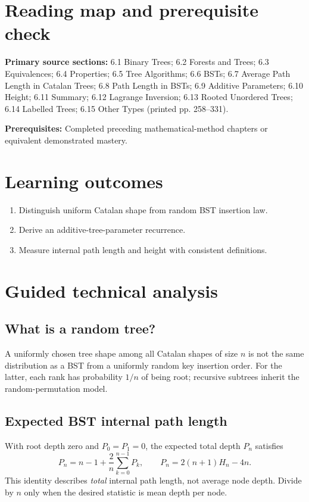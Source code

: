\documentclass[11pt]{article}
\begin{document}
\makedoctocpage
\section{Reading map and prerequisite check}
\noindent\textbf{Primary source sections:} 6.1 Binary Trees; 6.2 Forests and Trees; 6.3 Equivalences; 6.4 Properties; 6.5 Tree Algorithms; 6.6 BSTs; 6.7 Average Path Length in Catalan Trees; 6.8 Path Length in BSTs; 6.9 Additive Parameters; 6.10 Height; 6.11 Summary; 6.12 Lagrange Inversion; 6.13 Rooted Unordered Trees; 6.14 Labelled Trees; 6.15 Other Types (printed pp. 258--331).\par
\noindent\textbf{Prerequisites:} Completed preceding mathematical-method chapters or equivalent demonstrated mastery.\par
\section{Learning outcomes}
\begin{enumerate}
\item Distinguish uniform Catalan shape from random BST insertion law.
\item Derive an additive-tree-parameter recurrence.
\item Measure internal path length and height with consistent definitions.
\end{enumerate}
\section{Guided technical analysis}
\subsection{What is a random tree?}
A uniformly chosen tree shape among all Catalan shapes of size $n$ is not the same distribution as a BST from a uniformly random key insertion order. For the latter, each rank has probability $1/n$ of being root; recursive subtrees inherit the random-permutation model.
\subsection{Expected BST internal path length}
With root depth zero and $P_0=P_1=0$, the expected total depth $P_n$ satisfies
\[
P_n=n-1+\frac{2}{n}\sum_{k=0}^{n-1}P_k,
\qquad P_n=2(n+1)H_n-4n.
\]
This identity describes \emph{total} internal path length, not average node depth. Divide by $n$ only when the desired statistic is mean depth per node.
\end{document}
